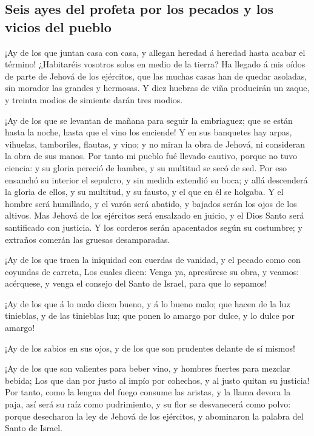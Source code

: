 \hypertarget{seis-ayes-del-profeta-por-los-pecados-y-los-vicios-del-pueblo}{%
\subsection{Seis ayes del profeta por los pecados y los vicios del
pueblo}\label{seis-ayes-del-profeta-por-los-pecados-y-los-vicios-del-pueblo}}

 ¡Ay de los que juntan casa con casa, y allegan heredad á
heredad hasta acabar el término! ¿Habitaréis vosotros solos en medio de
la tierra?  Ha llegado á mis oídos de parte de Jehová de
los ejércitos, que las muchas casas han de quedar asoladas, sin morador
las grandes y hermosas.  Y diez huebras de viña
producirán un zaque, y treinta modios de simiente darán tres modios.

 ¡Ay de los que se levantan de mañana para seguir la
embriaguez; que se están hasta la noche, hasta que el vino los enciende!
 Y en sus banquetes hay arpas, vihuelas, tamboriles,
flautas, y vino; y no miran la obra de Jehová, ni consideran la obra de
sus manos.  Por tanto mi pueblo fué llevado cautivo,
porque no tuvo ciencia: y su gloria pereció de hambre, y su multitud se
secó de sed.  Por eso ensanchó su interior el sepulcro, y
sin medida extendió su boca; y allá descenderá la gloria de ellos, y su
multitud, y su fausto, y el que en él se holgaba.  Y el
hombre será humillado, y el varón será abatido, y bajados serán los ojos
de los altivos.  Mas Jehová de los ejércitos será
ensalzado en juicio, y el Dios Santo será santificado con justicia.
 Y los corderos serán apacentados según su costumbre; y
extraños comerán las gruesas desamparadas.

 ¡Ay de los que traen la iniquidad con cuerdas de
vanidad, y el pecado como con coyundas de carreta,  Los
cuales dicen: Venga ya, apresúrese su obra, y veamos: acérquese, y venga
el consejo del Santo de Israel, para que lo sepamos!

 ¡Ay de los que á lo malo dicen bueno, y á lo bueno malo;
que hacen de la luz tinieblas, y de las tinieblas luz; que ponen lo
amargo por dulce, y lo dulce por amargo!

 ¡Ay de los sabios en sus ojos, y de los que son
prudentes delante de sí mismos!

 ¡Ay de los que son valientes para beber vino, y hombres
fuertes para mezclar bebida;  Los que dan por justo al
impío por cohechos, y al justo quitan su justicia!  Por
tanto, como la lengua del fuego consume las aristas, y la llama devora
la paja, así será su raíz como pudrimiento, y su flor se desvanecerá
como polvo: porque desecharon la ley de Jehová de los ejércitos, y
abominaron la palabra del Santo de Israel.

